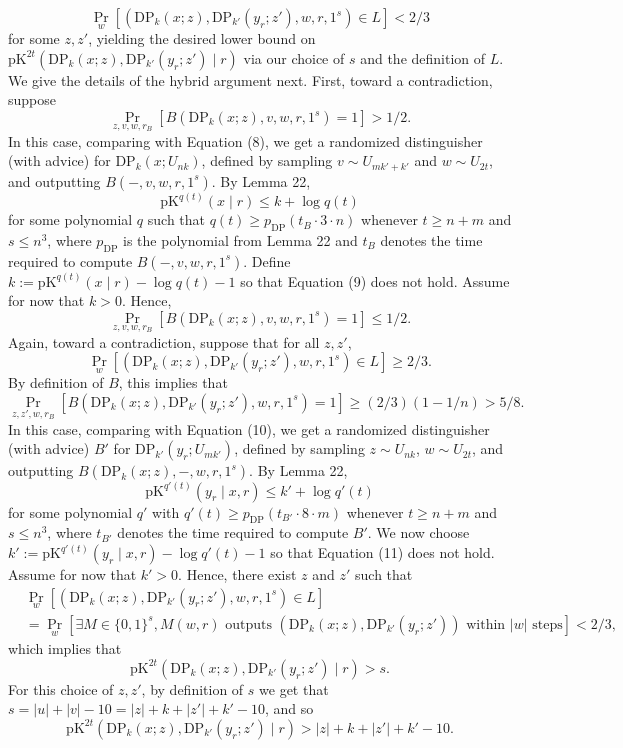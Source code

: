 \[\Pr_w[(\mathrm{DP}_k(x;z),\mathrm{DP}_{k'}(y_r;z'),w,r,1^s)\in L]<2/3\]
for some $z,z'$, yielding the desired lower bound on $\mathrm{pK}^{2t}(\mathrm{DP}_k(x;z),\mathrm{DP}_{k'}(y_r;z')\mid r)$ via our choice of $s$ and the definition of $L$. We give the details of the hybrid argument next.
First, toward a contradiction, suppose
\[\Pr_{z,v,w,r_B}[B(\mathrm{DP}_k(x;z),v,w,r,1^s)=1]>1/2.\]
In this case, comparing with Equation (8), we get a randomized distinguisher (with advice) for $\mathrm{DP}_k(x;U_{nk})$, defined by sampling $v\sim U_{mk'+k'}$ and $w\sim U_{2t}$, and outputting $B(-,v,w,r,1^s)$. By Lemma 22,
\[\mathrm{pK}^{q(t)}(x\mid r)\leq k+\log q(t)\tag{9}\]
for some polynomial $q$ such that $q(t)\geq p_{\mathrm{DP}}(t_B\cdot3\cdot n)$ whenever $t\geq n+m$ and $s\leq n^3$, where $p_{\mathrm{DP}}$ is the polynomial from Lemma 22 and $t_B$ denotes the time required to compute $B(-,v,w,r,1^s)$.
Define $k:=\mathrm{pK}^{q(t)}(x\mid r)-\log q(t)-1$ so that Equation (9) does not hold. Assume for now that $k>0$. Hence,
\[\Pr_{z,v,w,r_B}[B(\mathrm{DP}_k(x;z),v,w,r,1^s)=1]\leq1/2.\tag{10}\]
Again, toward a contradiction, suppose that for all $z,z'$,
\[\Pr_w[(\mathrm{DP}_k(x;z),\mathrm{DP}_{k'}(y_r;z'),w,r,1^s)\in L]\geq2/3.\]
By definition of $B$, this implies that
\[\Pr_{z,z',w,r_B}[B(\mathrm{DP}_k(x;z),\mathrm{DP}_{k'}(y_r;z'),w,r,1^s)=1]\geq(2/3)(1-1/n)>5/8.\]
In this case, comparing with Equation (10), we get a randomized distinguisher (with advice) $B'$ for $\mathrm{DP}_{k'}(y_r;U_{mk'})$, defined by sampling $z\sim U_{nk}$, $w\sim U_{2t}$, and outputting $B(\mathrm{DP}_k(x;z),-,w,r,1^s)$. By Lemma 22,
\[\mathrm{pK}^{q'(t)}(y_r\mid x,r)\leq k'+\log q'(t)\tag{11}\]
for some polynomial $q'$ with $q'(t)\geq p_{\mathrm{DP}}(t_{B'}\cdot8\cdot m)$ whenever $t\geq n+m$ and $s\leq n^3$, where $t_{B'}$ denotes the time required to compute $B'$.
We now choose $k':=\mathrm{pK}^{q'(t)}(y_r\mid x,r)-\log q'(t)-1$ so that Equation (11) does not hold. Assume for now that $k'>0$. Hence, there exist $z$ and $z'$ such that
\begin{align*}
&\Pr_w[(\mathrm{DP}_k(x;z),\mathrm{DP}_{k'}(y_r;z'),w,r,1^s)\in L]\\
&=\Pr_w[\exists M\in\{0,1\}^s,M(w,r)\text{ outputs }(\mathrm{DP}_k(x;z),\mathrm{DP}_{k'}(y_r;z'))\text{ within }|w|\text{ steps}]<2/3,
\end{align*}
which implies that
\[\mathrm{pK}^{2t}(\mathrm{DP}_k(x;z),\mathrm{DP}_{k'}(y_r;z')\mid r)>s.\]
For this choice of $z,z'$, by definition of $s$ we get that $s=|u|+|v|-10=|z|+k+|z'|+k'-10$, and so
\[\mathrm{pK}^{2t}(\mathrm{DP}_k(x;z),\mathrm{DP}_{k'}(y_r;z')\mid r)>|z|+k+|z'|+k'-10.\]
